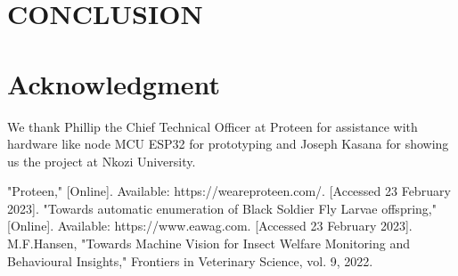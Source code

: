 \documentclass[conference]{IEEEtran}
\begin{document}
\section{CONCLUSION}

\section*{Acknowledgment}

We thank Phillip the Chief Technical Officer at Proteen for assistance with hardware like
node MCU ESP32 for prototyping and Joseph Kasana for showing us the project at Nkozi University.

\begin{thebibliography}{00}
      "Proteen," [Online]. Available: https://weareproteen.com/. [Accessed 23 February 2023].
      "Towards automatic enumeration of Black Soldier Fly Larvae offspring," [Online]. Available: https://www.eawag.com. [Accessed 23 February 2023].
      M.F.Hansen, "Towards Machine Vision for Insect Welfare Monitoring and Behavioural Insights," Frontiers in Veterinary Science, vol. 9, 2022.
\end{thebibliography}
\end{document}
